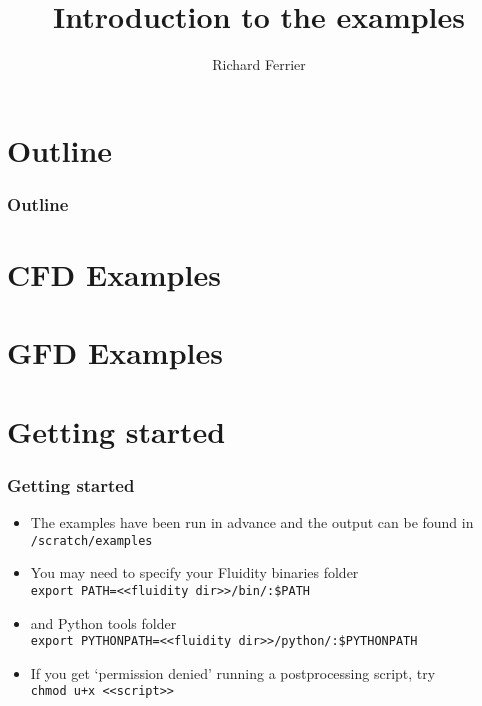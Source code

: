 \documentclass[10pt]{beamer}
\title[Introduction to the examples]{Introduction to the examples}
\subtitle[]{}
\institute{Department of Earth Science and Engineering, Imperial College London}
\author[Richard Ferrier]{\large{Richard Ferrier}}
\date{}
\begin{document}
\begin{frame}
  \titlepage
\end{frame}

\section*{Outline}
\begin{frame}
  \frametitle{Outline}
  \tableofcontents
\end{frame}

\section{CFD Examples}









\section{GFD Examples}








\section*{Getting started}
\begin{frame}
  \frametitle{Getting started}
  \begin{itemize}
  \item The examples have been run in advance and the output can be found in \texttt{/scratch/examples}
  \item You may need to specify your Fluidity binaries folder \\
    \texttt{export PATH=<<fluidity dir>>/bin/:\$PATH}
  \item and Python tools folder \\
    \texttt{export PYTHONPATH=<<fluidity dir>>/python/:\$PYTHONPATH}
  \item If you get `permission denied' running a postprocessing script, try \\
    \texttt{chmod u+x <<script>>}
  \end{itemize}
\end{frame}
\end{document}

